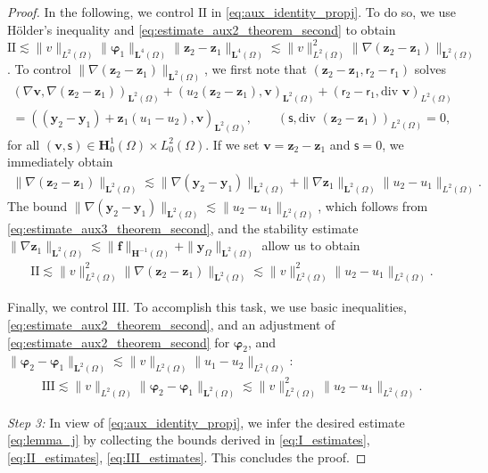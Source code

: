 \documentclass[final]{siamart0216}
\begin{document}
\begin{proof}
In the following, we control $\text{II}$ in \eqref{eq:aux_identity_propj}. To do so, we use H\"older's inequality and \eqref{eq:estimate_aux2_theorem_second} to obtain  $\text{II}\lesssim \|v\|_{L^2(\Omega)}\|\boldsymbol{\varphi}_1\|_{\mathbf{L}^4(\Omega)}\|\mathbf{z}_2-\mathbf{z}_1\|_{\mathbf{L}^{4}(\Omega)}\lesssim \|v\|_{L^2(\Omega)}^2 \|\nabla(\mathbf{z}_2-\mathbf{z}_1)\|_{\mathbf{L}^{2}(\Omega)}$. To control $\|\nabla(\mathbf{z}_2-\mathbf{z}_1)\|_{\mathbf{L}^{2}(\Omega)}$, we first note that  $(\mathbf{z}_2-\mathbf{z}_1,\mathsf{r}_2-\mathsf{r}_1)$ solves
\begin{multline*}
(\nabla \mathbf{v},\nabla (\mathbf{z}_2-\mathbf{z}_1))_{\mathbf{L}^2(\Omega)}+( u_2(\mathbf{z}_2-\mathbf{z}_1), \mathbf{v})_{\mathbf{L}^2(\Omega)}+(\mathsf{r}_2-\mathsf{r}_1,\text{div }\mathbf{v})_{L^2(\Omega)} \\= ((\mathbf{y}_2-\mathbf{y}_1)+\mathbf{z}_1(u_1-u_2),\mathbf{v})_{\mathbf{L}^2(\Omega)},\qquad
(\mathsf{s},\text{div }(\mathbf{z}_2-\mathbf{z}_1))_{L^2(\Omega)}  =  0,
\end{multline*}
for all $(\mathbf{v},\mathsf{s}) \in \mathbf{H}_0^1(\Omega) \times L_0^2(\Omega)$. If we set $\mathbf{v}=\mathbf{z}_2-\mathbf{z}_1$ and $\mathsf{s}=0$, we immediately obtain
\begin{align}
\|\nabla(\mathbf{z}_2-\mathbf{z}_1)\|_{\mathbf{L}^{2}(\Omega)}\lesssim \|\nabla(\mathbf{y}_2-\mathbf{y}_1)\|_{\mathbf{L}^{2}(\Omega)}+\|\nabla\mathbf{z}_1\|_{\mathbf{L}^{2}(\Omega)}\|u_2-u_1\|_{L^2(\Omega)}.
\end{align}
The bound $\|\nabla(\mathbf{y}_2-\mathbf{y}_1)\|_{\mathbf{L}^{2}(\Omega)}\lesssim\|u_2-u_1\|_{L^2(\Omega)}$, which follows from \eqref{eq:estimate_aux3_theorem_second}, and the stability estimate $\|\nabla\mathbf{z}_1\|_{\mathbf{L}^{2}(\Omega)} \lesssim \|\mathbf{f}\|_{\mathbf{H}^{-1}(\Omega)} + \|\mathbf{y}_{\Omega}\|_{\mathbf{L}^{2}(\Omega)}$ allow us to obtain
\begin{align}\label{eq:II_estimates}
\text{II}\lesssim \|v\|_{L^2(\Omega)}^2 \|\nabla(\mathbf{z}_2-\mathbf{z}_1)\|_{\mathbf{L}^{2}(\Omega)}\lesssim \|v\|_{L^2(\Omega)}^2 \|u_2-u_1\|_{L^2(\Omega)}.
\end{align}

Finally, we control $\text{III}$. To accomplish this task, we use basic inequalities, \eqref{eq:estimate_aux2_theorem_second}, and an adjustment of \eqref{eq:estimate_aux2_theorem_second} for $\boldsymbol{\varphi}_2$, and $\|\boldsymbol{\varphi}_2-\boldsymbol{\varphi}_1\|_{\mathbf{L}^2(\Omega)}\lesssim\|v\|_{L^2(\Omega)}\|u_1-u_2\|_{L^2(\Omega)}$:
\begin{align}\label{eq:III_estimates}
\text{III}\lesssim \|v\|_{L^2(\Omega)}\|\boldsymbol{\varphi}_2-\boldsymbol{\varphi}_1\|_{\mathbf{L}^2(\Omega)}\lesssim\|v\|_{L^2(\Omega)}^2 \|u_2-u_1\|_{L^2(\Omega)}.
\end{align}

\emph{Step 3:} In view of \eqref{eq:aux_identity_propj}, we infer the desired estimate \eqref{eq:lemma_j} by collecting the bounds derived in \eqref{eq:I_estimates}, \eqref{eq:II_estimates}, \eqref{eq:III_estimates}. This concludes the proof.
\end{proof}
\end{document}
